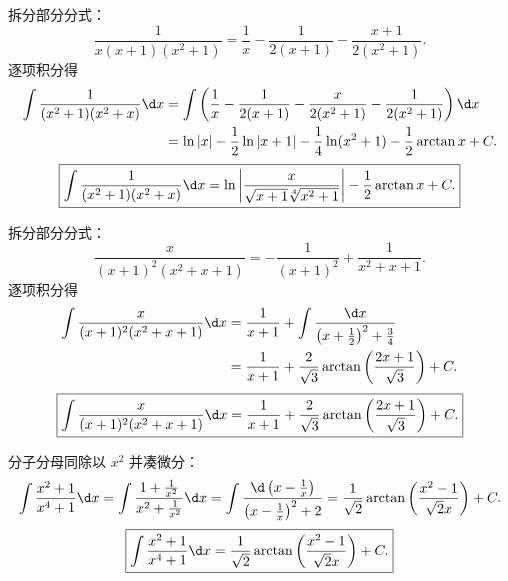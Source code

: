 \begin{solution}
    拆分部分分式：
    \begin{equation}
        \frac{1}{x(x + 1)(x^2 + 1)} = \frac{1}{x} - \frac{1}{2(x + 1)} - \frac{x + 1}{2(x^2 + 1)}.
    \end{equation}
    逐项积分得
    \begin{equation}
        \begin{aligned}
            \int \frac{1}{(x^2 + 1)(x^2 + x)} \d x & = \int \left( \frac{1}{x} - \frac{1}{2(x + 1)} - \frac{x}{2(x^2 + 1)} - \frac{1}{2(x^2 + 1)} \right) \d x \\
                                                   & = \ln|x| - \frac{1}{2}\ln|x + 1| - \frac{1}{4}\ln(x^2 + 1) - \frac{1}{2}\arctan x + C.
        \end{aligned}
    \end{equation}
    \begin{equation}
        \boxed{\int \frac{1}{(x^2 + 1)(x^2 + x)} \d x = \ln\left| \frac{x}{\sqrt{x + 1}\sqrt[4]{x^2 + 1}} \right| - \frac{1}{2}\arctan x + C.}
    \end{equation}


    拆分部分分式：
    \begin{equation}
        \frac{x}{(x + 1)^2(x^2 + x + 1)} = -\frac{1}{(x + 1)^2} + \frac{1}{x^2 + x + 1}.
    \end{equation}
    逐项积分得
    \begin{equation}
        \begin{aligned}
            \int \frac{x}{(x + 1)^2(x^2 + x + 1)} \d x & = \frac{1}{x + 1} + \int \frac{\d x}{\left(x + \frac{1}{2}\right)^2 + \frac{3}{4}}       \\
                                                       & = \frac{1}{x + 1} + \frac{2}{\sqrt{3}}\arctan\left( \frac{2x + 1}{\sqrt{3}} \right) + C.
        \end{aligned}
    \end{equation}
    \begin{equation}
        \boxed{\int \frac{x}{(x + 1)^2(x^2 + x + 1)} \d x = \frac{1}{x + 1} + \frac{2}{\sqrt{3}}\arctan\left( \frac{2x + 1}{\sqrt{3}} \right) + C.}
    \end{equation}


    分子分母同除以 $x^2$ 并凑微分：
    \begin{equation}
        \int \frac{x^2 + 1}{x^4 + 1} \d x = \int \frac{1 + \frac{1}{x^2}}{x^2 + \frac{1}{x^2}} \d x = \int \frac{\d\left(x - \frac{1}{x}\right)}{\left(x - \frac{1}{x}\right)^2 + 2} = \frac{1}{\sqrt{2}}\arctan\left( \frac{x^2 - 1}{\sqrt{2}x} \right) + C.
    \end{equation}
    \begin{equation}
        \boxed{\int \frac{x^2 + 1}{x^4 + 1} \d x = \frac{1}{\sqrt{2}}\arctan\left( \frac{x^2 - 1}{\sqrt{2}x} \right) + C.}
    \end{equation}


\end{solution}
